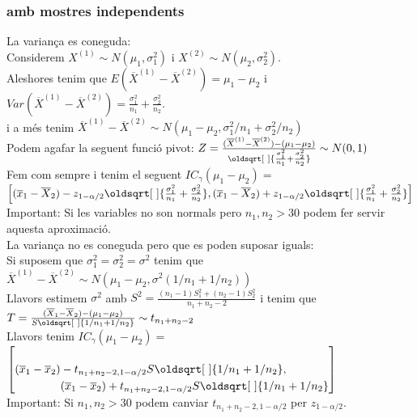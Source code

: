 \documentclass[a4paper]{sciposter}
\renewcommand*{\sqrt}[2][\ ]{\oldsqrt[#1]{#2} }
\begin{document}
\begin{multicols}{3}
\subsubsection{amb mostres independents}
La variança es coneguda:\\
Considerem $X^{(1)} \sim N(\mu_1, \sigma^2_1)$ i $X^{(2)} \sim N(\mu_2, \sigma^2_2)$.\\
Aleshores tenim que $E(\overline{X}^{(1)} - \overline{X}^{(2)}) = \mu_1 - \mu_2$ i $Var(\overline{X}^{(1)} - \overline{X}^{(2)}) = \frac{\sigma^2_1}{n_1} + \frac{\sigma^2_2}{n_2}$.\\
i a més tenim $\overline{X}^{(1)} - \overline{X}^{(2)} \sim N(\mu_1 - \mu_2, \sigma^2_1/n_1 + \sigma^2_2/n_2)$\\
Podem agafar la seguent funció pivot: $Z = \frac{(\overline{X}^{(1)} - \overline{X}^{(2)}) - (\mu_1 - \mu_2)}{\sqrt{\frac{\sigma^2_1}{n_1} + \frac{\sigma^2_2}{n_2}}} \sim N(0,1)$\\
Fem com sempre i tenim el seguent $IC_\gamma(\mu_1 - \mu_2) =$\\$\left[(\overline{x}_1 - \overline{X}_2) - z_{1-\alpha/2}\sqrt{\frac{\sigma^2_1}{n_1} +\frac{\sigma^2_2}{n_2}},(\overline{x}_1 - \overline{X}_2) + z_{1-\alpha/2}\sqrt{\frac{\sigma^2_1}{n_1} + \frac{\sigma^2_2}{n_2}}\right]$\\
Important: Si les variables no son normals pero $n_1, n_2 > 30$ podem fer servir aquesta aproximació.\\
La variança no es coneguda pero que es poden suposar iguals:\\
Si suposem que $\sigma^2_1 = \sigma^2_2 = \sigma^2$ tenim que $\overline{X}^{(1)} - \overline{X}^{(2)} \sim N(\mu_1 - \mu_2, \sigma^2(1/n_1 + 1/n_2))$\\
Llavors estimem $\sigma^2$ amb $S^2 = \frac{(n_1-1)S_1^2 + (n_2-1)S_2^2}{n_1 + n_2 - 2}$ i tenim que $T = \frac{(\overline{X}_1 - \overline{X}_2) - (\mu_1 - \mu_2)}{S\sqrt{1/n_1 + 1/n_2}} \sim t_{n_1 + n_2 - 2}$\\
Llavors tenim $IC_\gamma(\mu_1 - \mu_2) =$\\$\left[\begin{aligned}[t](\overline{x}_1 - \overline{x}_2) &- t_{n_1 + n_2 - 2, 1-\alpha/2}S\sqrt{1/n_1 + 1/n_2},\\ &(\overline{x}_1 - \overline{x}_2) + t_{n_1 + n_2 - 2, 1-\alpha/2}S\sqrt{1/n_1 + 1/n_2}\end{aligned}\right]$\\
Important: Si $n_1, n_2 > 30$ podem canviar $t_{n_1 + n_2 - 2, 1-\alpha/2}$ per $z_{1-\alpha/2}$.\\

\end{multicols}
\end{document}
